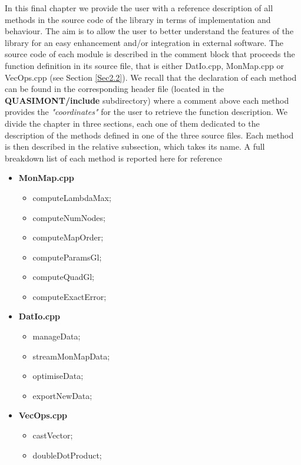\documentclass[a4paper, twosided]{book}
\begin{document}
In this final chapter we provide the user with a reference description of all methods in the source code of the library in terms of implementation and behaviour. The aim is to allow the user to better understand the features of the library for an easy enhancement and/or integration in external software. The source code of each module is described in the comment block that proceeds the function definition in its source file, that is either \colorbox{poliGrayBlue}{DatIo.cpp}, \colorbox{poliGrayBlue}{MonMap.cpp} or \colorbox{poliGrayBlue}{VecOps.cpp} (see Section \ref{Sec2.2}). We recall that the declaration of each method can be found in the corresponding header file (located in the \colorbox{poliGrayBlue}{\textbf{QUASIMONT/include}} subdirectory) where a comment above each method provides the \textsl{"coordinates"} for the user to retrieve the function description. We divide the chapter in three sections, each one of them dedicated to the description of the methods defined in one of the three source files. Each method is then described in the relative subsection, which takes its name. A full breakdown list of each method is reported here for reference

\begin{itemize}
    \item \ttfamily \color{poliDarkBlue}\textbf{MonMap.cpp} \color{black}
          \begin{itemize}
                 \item \ttfamily computeLambdaMax;
                 \item \ttfamily computeNumNodes;
                 \item \ttfamily computeMapOrder;
                 \item \ttfamily computeParamsGl;
                 \item \ttfamily computeQuadGl;
                 \item \ttfamily computeExactError;
          \end{itemize}
          
   \item \ttfamily \color{poliDarkBlue}\textbf{DatIo.cpp} \color{black}
          \begin{itemize}
                 \item \ttfamily manageData;
                 \item \ttfamily streamMonMapData;
                 \item \ttfamily optimiseData;
                 \item \ttfamily exportNewData;
          \end{itemize}
          
    \item \ttfamily \color{poliDarkBlue}\textbf{VecOps.cpp} \color{black}
          \begin{itemize}
                 \item \ttfamily castVector;
                 \item \ttfamily doubleDotProduct;
          \end{itemize}
\end{itemize}
\end{document}
